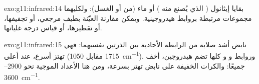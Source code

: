 \begin{solution}{exo:g11:infrared:14}
بقايا إيثانول ( الذي يُصنع منه ) أو ماء (من
 أو الغسل): ولكليهما مجموعات  مرتبطة بروابط هيدروجينية. ويمكن
مقارنة العيّنة بطيف مرجعي، أو تجفيفها، أو تقطيرها، أو
قياس درجة غليانها.
\end{solution}

\begin{solution}{exo:g11:infrared:15}
 نابض أشد صلابة من الرابطة الأحادية بين الذرتين
نفسيهما: فهي تهتز أسرع، عند  أعلى (1715 مقابل
\qty{1050}{cm^{-1}}). وروابط  و و كلها
تضم  هيدروجين، أخف  جميعًا: والكرات الخفيفة على نابض
تهتز بسرعة، ومن هنا الأعداد الموجية نحو 2900--\qty{3600}{cm^{-1}}.
\end{solution}

